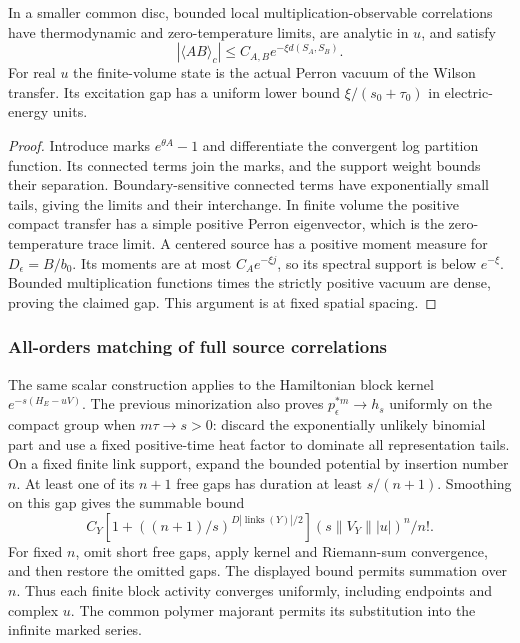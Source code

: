\begin{theorem}
\label{thm:wdt-vacuum}
In a smaller common disc, bounded local multiplication-observable
correlations have thermodynamic and zero-temperature limits, are analytic
in $u$, and satisfy
\[
 |\langle AB\rangle_c|\le C_{A,B}e^{-\xi d(S_A,S_B)}.
\]
For real $u$ the finite-volume state is the actual Perron vacuum of the
Wilson transfer. Its excitation gap has a uniform lower bound
$\xi/(s_0+\tau_0)$ in electric-energy units.
\end{theorem}
\begin{proof}
Introduce marks $e^{\theta A}-1$ and differentiate the convergent log
partition function. Its connected terms join the marks, and the support
weight bounds their separation. Boundary-sensitive connected terms have
exponentially small tails, giving the limits and their interchange.
In finite volume the positive compact transfer has a simple positive
Perron eigenvector, which is the zero-temperature trace limit. A centered
source has a positive moment measure for $D_\epsilon=B/b_0$. Its moments
are at most $C_Ae^{-\xi j}$, so its spectral support is below $e^{-\xi}$.
Bounded multiplication functions times the strictly positive vacuum are
dense, proving the claimed gap. This argument is at fixed spatial spacing.
\end{proof}

\subsubsection{All-orders matching of full source correlations}
The same scalar construction applies to the Hamiltonian block kernel
$e^{-s(H_E-uV)}$. The previous minorization also proves
$p_\epsilon^{*m}\to h_s$ uniformly on the compact group when
$m\tau\to s>0$: discard the exponentially unlikely binomial part and
use a fixed positive-time heat factor to dominate all representation tails.
On a fixed finite link support, expand the bounded potential by insertion
number $n$. At least one of its $n+1$ free gaps has duration at least
$s/(n+1)$. Smoothing on this gap gives the summable bound
\[
 C_Y[1+((n+1)/s)^{D|\operatorname{links}(Y)|/2}]
 (s\|V_Y\||u|)^n/n!.
\]
For fixed $n$, omit short free gaps, apply kernel and Riemann-sum
convergence, and then restore the omitted gaps. The displayed bound permits
summation over $n$. Thus each finite block activity converges uniformly,
including endpoints and complex $u$. The common polymer majorant permits
its substitution into the infinite marked series.

